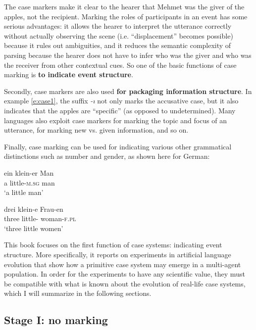 The case markers make it clear to the hearer that Mehmet was the giver of the apples, not the recipient. Marking the roles of participants in an event has some serious advantages: it allows the hearer to interpret the utterance correctly without actually observing the scene (i.e. ``displacement'' becomes possible) because it rules out ambiguities, and it reduces the semantic complexity of parsing because the hearer does not have to infer who was the giver and who was the receiver from other contextual cues. So one of the basic functions of case marking is {\bfseries to indicate event structure}.

Secondly, case markers are also used {\bfseries for packaging information structure}. In example \ref{e:case1}, the suffix {\em -ı} not only marks the accusative case, but it also indicates that the apples are ``specific'' (as opposed to undetermined). Many languages also exploit case markers for marking the topic and focus of an utterance, for marking new vs. given information, and so on.

Finally, case marking can be used for indicating various other grammatical distinctions such as number and gender, as shown here for German:

\ea
\gll ein klein-er Man \\
a little-\textsc{m.sg} man \\
\glt `a little man' \\
\z

\ea
\gll drei klein-e Frau-en \\ 
three little-{\pl} woman-\textsc{f.pl} \\
\glt `three little women' \\
\z

This book focuses on the first function of case systems: indicating event structure. More specifically, it reports on experiments in artificial language evolution that show how a primitive case system may emerge in a multi-agent population. In order for the experiments to have any scientific value, they must be compatible with what is known about the evolution of real-life case systems, which I will summarize in the following sections.

\subsection{Stage I: no marking}
\label{s:stage1}

